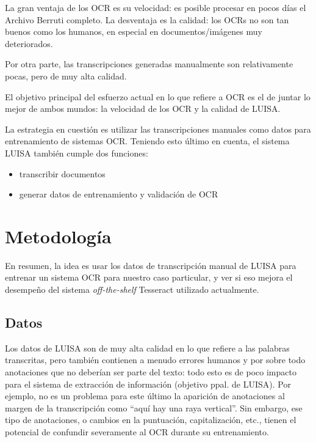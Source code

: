 \documentclass{article}
\begin{document}
La gran ventaja de los OCR es su velocidad: es posible procesar en pocos días
el Archivo Berruti completo. La desventaja es la calidad: los OCRs no son
tan buenos como los humanos, en especial en documentos/imágenes muy deteriorados.

Por otra parte, las transcripciones generadas manualmente son relativamente pocas,
pero de muy alta calidad. 

El objetivo principal del esfuerzo actual en lo que refiere a OCR es el de juntar
lo mejor de ambos mundos: la velocidad de los OCR y la calidad de LUISA.

La estrategia en cuestión es utilizar las transcripciones manuales
como datos para entrenamiento de sistemas OCR. Teniendo esto último en cuenta,
el sistema LUISA también cumple dos funciones:

\begin{itemize}
\item transcribir documentos
\item generar datos de entrenamiento y validación de OCR
\end{itemize}

\section{Metodología}

En resumen, la idea es usar los datos de transcripción manual de LUISA para 
entrenar un sistema OCR para nuestro caso particular, y ver si eso mejora
el desempeño del sistema \emph{off-the-shelf} Tesseract utilizado actualmente.

\subsection{Datos}

Los datos de LUISA son de muy alta calidad en lo que refiere
a las palabras transcritas, pero también contienen a menudo errores humanos
y por sobre todo anotaciones que no deberían ser parte del texto: todo esto es
de poco impacto para el sistema de extracción de información (objetivo ppal.
de LUISA). Por ejemplo, no es un problema para este último la aparición de 
anotaciones al margen de la transcripción como ``aquí hay una raya vertical''.
Sin embargo, ese tipo de anotaciones, o cambios en la puntuación, capitalización,
etc., tienen el potencial de confundir severamente al OCR durante su entrenamiento.
\end{document}
